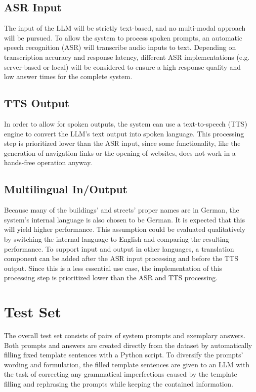\documentclass{article}
\begin{document}
\subsection{ASR Input}
The input of the LLM will be strictly text-based, and no multi-modal approach will be pursued. To allow the system to process spoken prompts, an automatic speech recognition (ASR) will transcribe audio inputs to text. Depending on transcription accuracy and response latency, different ASR implementations (e.g. server-based or local) will be considered to ensure a high response quality and low answer times for the complete system.

\subsection{TTS Output}
In order to allow for spoken outputs, the system can use a text-to-speech (TTS) engine to convert the LLM's text output into spoken language. This processing step is prioritized lower than the ASR input, since some functionality, like the generation of navigation links or the opening of websites, does not work in a hands-free operation anyway.

\subsection{Multilingual In/Output}
Because many of the buildings' and streets' proper names are in German, the system's internal language is also chosen to be German. It is expected that this will yield higher performance. This assumption could be evaluated qualitatively by switching the internal language to English and comparing the resulting performance. To support input and output in other languages, a translation component can be added after the ASR input processing and before the TTS output. Since this is a less essential use case, the implementation of this processing step is prioritized lower than the ASR and TTS processing.

\section{Test Set} \label{sec:test_set}
The overall test set consists of pairs of system prompts and exemplary answers. Both prompts and answers are created directly from the dataset by automatically filling fixed template sentences with a Python script. To diversify the prompts' wording and formulation, the filled template sentences are given to an LLM with the task of correcting any grammatical imperfections caused by the template filling and rephrasing the prompts while keeping the contained information.\\
\end{document}
